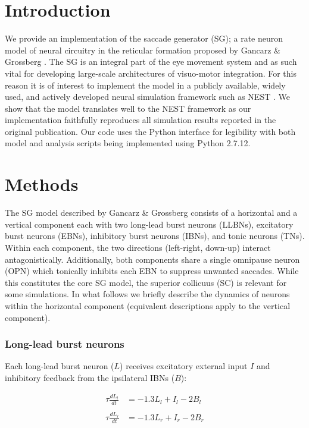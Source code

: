 \documentclass[10pt,a4paper,onecolumn]{article}
\begin{document}
\section{Introduction}\label{introduction}

We provide an implementation of the saccade generator (SG); a rate
neuron model of neural circuitry in the reticular formation proposed by
Gancarz \& Grossberg \autocite{Gancarz1998}. The SG is an integral part
of the eye movement system \autocite{Grossberg2012} and as such vital
for developing large-scale architectures of visuo-motor integration. For
this reason it is of interest to implement the model in a publicly
available, widely used, and actively developed neural simulation
framework such as NEST \autocite{Gewaltig2007}. We show that the model
translates well to the NEST framework as our implementation faithfully
reproduces all simulation results reported in the original publication.
Our code uses the Python interface \autocite{Eppler2008} for legibility
with both model and analysis scripts being implemented using Python
2.7.12.

\section{Methods}\label{methods}

The SG model described by Gancarz \& Grossberg \autocite{Gancarz1998}
consists of a horizontal and a vertical component each with two
long-lead burst neurons (LLBNs), excitatory burst neurons (EBNs),
inhibitory burst neurons (IBNs), and tonic neurons (TNs). Within each
component, the two directions (left-right, down-up) interact
antagonistically. Additionally, both components share a single omnipause
neuron (OPN) which tonically inhibits each EBN to suppress unwanted
saccades. While this constitutes the core SG model, the superior
collicuus (SC) is relevant for some simulations. In what follows we
briefly describe the dynamics of neurons within the horizontal component
(equivalent descriptions apply to the vertical component).

\subsubsection{Long-lead burst neurons}\label{long-lead-burst-neurons}

Each long-lead burst neuron (\(L\)) receives excitatory external input
\(I\) and inhibitory feedback from the ipsilateral IBNs (\(B\)):

\begin{equation}
\begin{array}{ll}
\tau\frac{dL_l}{dt} &= -1.3L_l+I_l-2B_l \\\\
\tau\frac{dL_r}{dt} &= -1.3L_r+I_r-2B_r \\
\end{array}
\label{eq:llbn}\end{equation}
\end{document}
